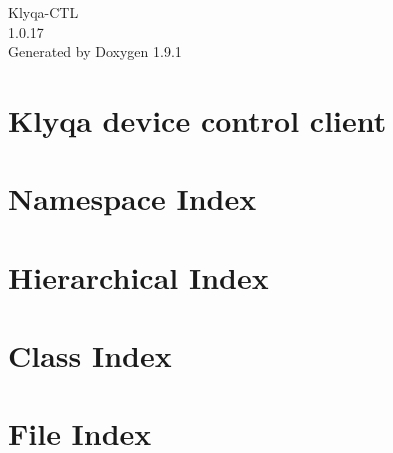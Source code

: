 \let\mypdfximage\pdfximage\def\pdfximage{\immediate\mypdfximage}\documentclass[twoside]{book}
\newcommand{\+}{\discretionary{\mbox{\scriptsize$\hookleftarrow$}}{}{}}
\newcommand{\clearemptydoublepage}{%
  \newpage{\pagestyle{empty}\cleardoublepage}%
}
\begin{document}
\raggedbottom

\hypersetup{pageanchor=false,
             bookmarksnumbered=true,
             pdfencoding=unicode
            }
\begin{titlepage}
\vspace*{7cm}
\begin{center}%
{\Large Klyqa-\/\+CTL \\[1ex]\large 1.\+0.\+17 }\\
\vspace*{1cm}
{\large Generated by Doxygen 1.9.1}\\
\end{center}
\end{titlepage}
\clearemptydoublepage
{}
\tableofcontents
\clearemptydoublepage
{}
\hypersetup{pageanchor=true}

\chapter{Klyqa device control client}
\label{md_README}

\chapter{Namespace Index}

\chapter{Hierarchical Index}

\chapter{Class Index}

\chapter{File Index}

\end{document}
